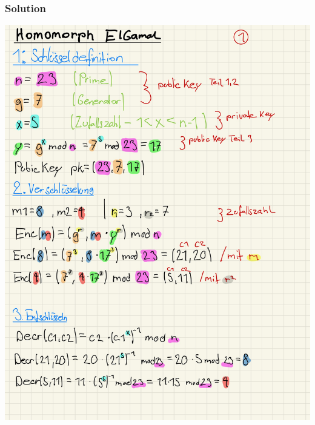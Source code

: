 \documentclass[11pt]{article}
\begin{document}
\hypertarget{solution}{%
\subsubsection{Solution}\label{solution}}


\begin{center}
	\includegraphics[scale=0.93]{img/helg1.jpg} \\
\end{center}

\break
\end{document}
